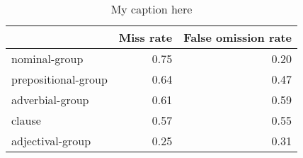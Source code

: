 \begin{table}[!ht]
\centering
\begin{tabular}{lrr}
\toprule
{} &  Miss rate &  False omission rate \\
\midrule
nominal-group       &       0.75 &                 0.20 \\
prepositional-group &       0.64 &                 0.47 \\
adverbial-group     &       0.61 &                 0.59 \\
clause              &       0.57 &                 0.55 \\
adjectival-group    &       0.25 &                 0.31 \\
\bottomrule
\end{tabular}
\caption{My caption here}
\label{tab:unit-types-ocd-exact-errors}
\end{table}